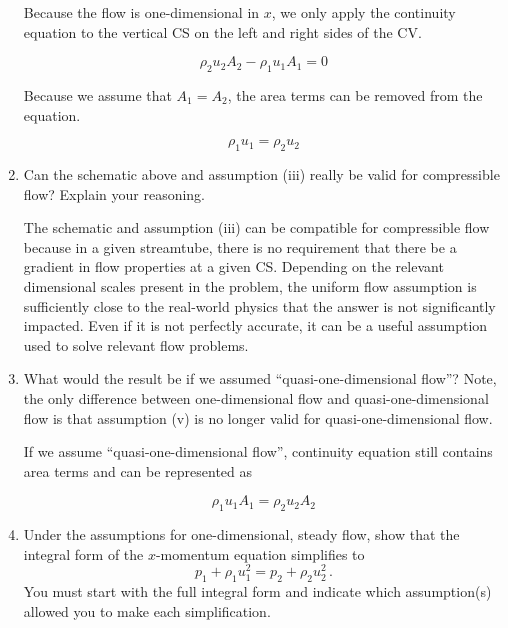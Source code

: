\documentclass[../main.tex]{subfiles}
\begin{document}
\begin{enumerate}[label = (\alph*)]
        Because the flow is one-dimensional in \(x\), we only apply the continuity equation to the vertical CS on the left and right sides of the CV.

        \begin{equation*}
            \rho_2 u_2 A_2 - \rho_1 u_1 A_1 = 0 
        \end{equation*}

        Because we assume that \(A_1 = A_2\), the area terms can be removed from the equation.

        \begin{equation*}
            \boxed{\rho_1 u_1 = \rho_2 u_2}
        \end{equation*}

    \item 
        Can the schematic above and assumption (iii) really be valid for compressible flow?
        Explain your reasoning.

        The schematic and assumption (iii) can be compatible for compressible flow because in a given streamtube, there is no requirement that there be a gradient in flow properties at a given CS.
        Depending on the relevant dimensional scales present in the problem, the uniform flow assumption is sufficiently close to the real-world physics that the answer is not significantly impacted.
        Even if it is not perfectly accurate, it can be a useful assumption used to solve relevant flow problems.

    \item 
        What would the result be if we assumed ``quasi-one-dimensional flow''?
        Note, the only difference between one-dimensional flow and quasi-one-dimensional flow is that assumption (v) is no longer valid for quasi-one-dimensional flow.

        If we assume ``quasi-one-dimensional flow'', continuity equation still contains area terms and can be represented as

        \begin{equation*}
            \boxed{\rho_1 u_1 A_1 = \rho_2 u_2 A_2}
        \end{equation*}

    \item
        Under the assumptions for one-dimensional, steady flow, show that the integral form of the $x$-momentum equation simplifies to
        \[
            p_1 + \rho_1 u_1^2 = p_2 + \rho_2 u_2^2 \, .
        \]
        You must start with the full integral form and indicate which assumption(s) allowed you to make each simplification.


\end{enumerate}
\end{document}

